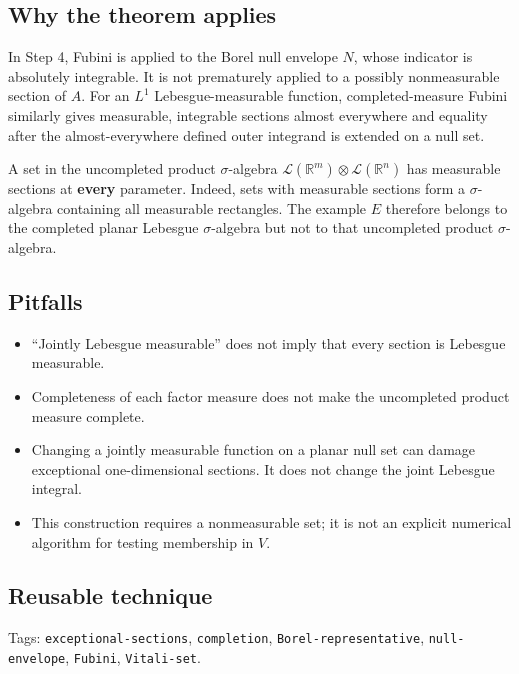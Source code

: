 \documentclass[
  11pt,
]{article}
\providecommand{\tightlist}{%
  \setlength{\itemsep}{0pt}\setlength{\parskip}{0pt}}
\begin{document}
\subsection{Why the theorem applies}\label{why-the-theorem-applies-2}

In Step 4, Fubini is applied to the Borel null envelope \(N\), whose
indicator is absolutely integrable. It is not prematurely applied to a
possibly nonmeasurable section of \(A\). For an \(L^1\)
Lebesgue-measurable function, completed-measure Fubini similarly gives
measurable, integrable sections almost everywhere and equality after the
almost-everywhere defined outer integrand is extended on a null set.

A set in the uncompleted product \(\sigma\)-algebra
\(\mathcal L(\mathbb R^m)\otimes\mathcal L(\mathbb R^n)\) has measurable
sections at \textbf{every} parameter. Indeed, sets with measurable
sections form a \(\sigma\)-algebra containing all measurable rectangles.
The example \(E\) therefore belongs to the completed planar Lebesgue
\(\sigma\)-algebra but not to that uncompleted product
\(\sigma\)-algebra.

\subsection{Pitfalls}\label{pitfalls-2}

\begin{itemize}
\tightlist
\item
  ``Jointly Lebesgue measurable'' does not imply that every section is
  Lebesgue measurable.
\item
  Completeness of each factor measure does not make the uncompleted
  product measure complete.
\item
  Changing a jointly measurable function on a planar null set can damage
  exceptional one-dimensional sections. It does not change the joint
  Lebesgue integral.
\item
  This construction requires a nonmeasurable set; it is not an explicit
  numerical algorithm for testing membership in \(V\).
\end{itemize}

\subsection{Reusable technique}\label{reusable-technique-2}

\begingroup\small\raggedright Tags: \texttt{exceptional-\allowbreak{}sections}, \texttt{completion},
\texttt{Borel-\allowbreak{}representative}, \texttt{null-\allowbreak{}envelope}, \texttt{Fubini},
\texttt{Vitali-\allowbreak{}set}.\par\endgroup
\end{document}
